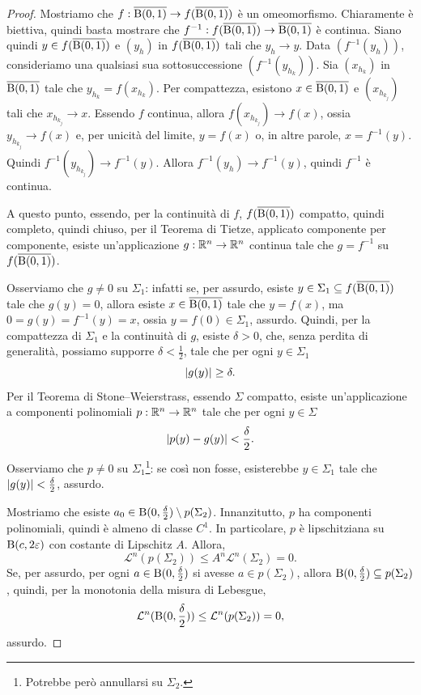 \begin{proof}
	Mostriamo che $f: \overline{\textup{B}(0,1)} \to f(\overline{\textup{B}(0,1)})$ è un omeomorfismo. Chiaramente è biettiva, quindi basta mostrare che $f^{-1}:f(\overline{\textup{B}(0,1)}) \to \overline{\textup{B}(0,1)}$ è continua. Siano quindi $y \in f(\overline{\textup{B}(0,1)})$ e $(y_h)$ in $f(\overline{\textup{B}(0,1)})$ tali che $y_h \to y$. Data $(f^{-1}(y_h))$, consideriamo una qualsiasi sua sottosuccessione $(f^{-1}(y_{h_k}))$. Sia $(x_{h_k})$ in $\overline{\textup{B}(0,1)}$ tale che $y_{h_k} = f(x_{h_k})$. Per compattezza, esistono $x \in \overline{\textup{B}(0,1)}$ e $(x_{h_{k_j}})$ tali che $x_{h_{k_j}} \to x$. Essendo $f$ continua, allora $f(x_{h_{k_j}}) \to f(x)$, ossia $y_{h_{k_j}} \to f(x)$ e, per unicità del limite, $y = f(x)$ o, in altre parole, $x = f^{-1}(y)$. Quindi $f^{-1}(y_{h_{k_j}}) \to f^{-1}(y)$. Allora $f^{-1}(y_h)\to f^{-1}(y)$, quindi $f^{-1}$ è continua.
	
	A questo punto, essendo, per la continuità di $f$, $f(\overline{\textup{B}(0,1)})$ compatto, quindi completo, quindi chiuso, per il Teorema di Tietze, applicato componente per componente, esiste un'applicazione $g: \mathbb{R}^n \to \mathbb{R}^n$ continua tale che $g = f^{-1}$ su $f(\overline{\textup{B}(0,1)})$. 
	
	Osserviamo che $g \ne 0$ su $\Sigma_1$: infatti se, per assurdo, esiste $y \in \Sigma_1 \subseteq f(\overline{\textup{B}(0,1)})$ tale che $g(y)=0$, allora esiste $x \in \overline{\textup{B}(0,1)}$ tale che $y=f(x)$, ma $0= g(y) = f^{-1}(y) = x$, ossia $y = f(0) \in \Sigma_1$, assurdo. Quindi, per la compattezza di $\Sigma_1$ e la continuità di $g$, esiste $\delta >0$, che, senza perdita di generalità, possiamo supporre $\delta < \frac{1}{2}$, tale che per ogni $y \in \Sigma_1$
	\[ \lvert g(y)\rvert \ge \delta. \]
	Per il Teorema di Stone--Weierstrass, essendo $\Sigma$ compatto, esiste un'applicazione a componenti polinomiali $p:\mathbb{R}^n \to \mathbb{R}^n$ tale che per ogni $y \in \Sigma$
	\[ \lvert p(y)-g(y)\rvert< \frac{\delta}{2}. \]
	Osserviamo che $p \ne 0$ su $\Sigma_1$\footnote{Potrebbe però annullarsi su $\Sigma_2$.}: se così non fosse, esisterebbe $y \in \Sigma_1$ tale che $\lvert g(y)\rvert<\frac{\delta}{2}$, assurdo.
	
	Mostriamo che esiste $a_0 \in \textup{B}(0,\frac{\delta}{2})\setminus p(\Sigma_2)$. Innanzitutto, $p$ ha componenti polinomiali, quindi è almeno di classe $C^1$. In particolare, $p$ è lipschitziana su $\textup{B}(c,2\varepsilon)$ con costante di Lipschitz $A$. Allora,
	\[ \mathcal{L}^n(p(\Sigma_2))\le A^n \mathcal{L}^n(\Sigma_2) =0. \]
	Se, per assurdo, per ogni $a \in \textup{B}(0,\frac{\delta}{2})$ si avesse $a \in p(\Sigma_2)$, allora $\textup{B}(0,\frac{\delta}{2}) \subseteq p(\Sigma_2)$, quindi, per la monotonia della misura di Lebesgue,
	\[ \mathcal{L}^n(\textup{B}(0,\frac{\delta}{2})) \le \mathcal{L}^n(p(\Sigma_2)) = 0, \]
	assurdo.
	

\end{proof}
